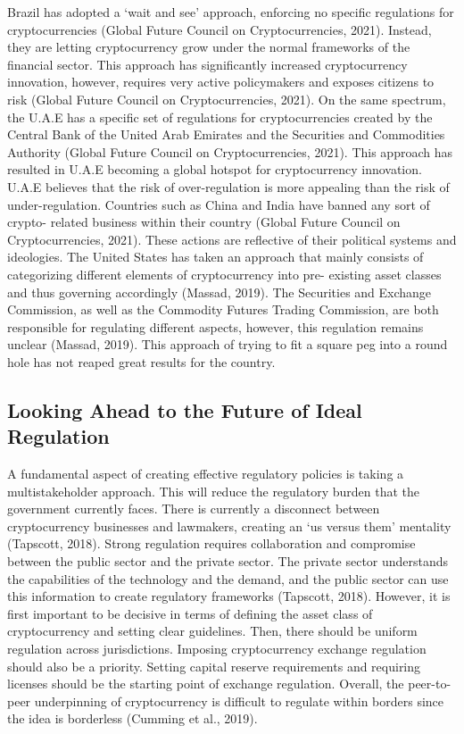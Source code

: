 \documentclass{article}
\begin{document}
\noindent \newline Brazil has adopted a ‘wait and see’ approach, enforcing no specific regulations for cryptocurrencies (Global Future Council on Cryptocurrencies, 2021). Instead, they are letting cryptocurrency grow under the normal frameworks of the financial sector. This approach has significantly increased cryptocurrency innovation, however, requires very active policymakers and exposes citizens to risk (Global Future Council on Cryptocurrencies, 2021). On the same spectrum, the U.A.E has a specific set of regulations for cryptocurrencies created by the Central Bank of the United Arab Emirates and the Securities and Commodities Authority (Global Future Council on Cryptocurrencies, 2021). This approach has resulted in U.A.E becoming a global hotspot for cryptocurrency innovation. U.A.E believes that the risk of over-regulation is more appealing than the risk of under-regulation. Countries such as China and India have banned any sort of crypto- related business within their country (Global Future Council on Cryptocurrencies, 2021). These actions are reflective of their political systems and ideologies. The United States has taken an approach that mainly consists of categorizing different elements of cryptocurrency into pre- existing asset classes and thus governing accordingly (Massad, 2019). The Securities and Exchange Commission, as well as the Commodity Futures Trading Commission, are both responsible for regulating different aspects, however, this regulation remains unclear (Massad, 2019). This approach of trying to fit a square peg into a round hole has not reaped great results for the country.

\subsection{Looking Ahead to the Future of Ideal Regulation}

\noindent A fundamental aspect of creating effective regulatory policies is taking a multistakeholder approach. This will reduce the regulatory burden that the government currently faces. There is currently a disconnect between cryptocurrency businesses and lawmakers, creating an ‘us versus them’ mentality (Tapscott, 2018). Strong regulation requires collaboration and compromise between the public sector and the private sector. The private sector understands the capabilities of the technology and the demand, and the public sector can use this information to create regulatory frameworks (Tapscott, 2018). However, it is first important to be decisive in terms of defining the asset class of cryptocurrency and setting clear guidelines. Then, there should be uniform regulation across jurisdictions. Imposing cryptocurrency exchange regulation should also be a priority. Setting capital reserve requirements and requiring licenses should be the starting point of exchange regulation. Overall, the peer-to-peer underpinning of cryptocurrency is difficult to regulate within borders since the idea is borderless (Cumming et al., 2019). 
\end{document}
